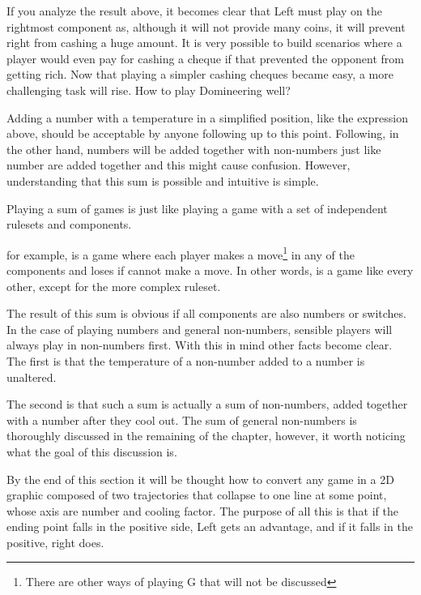 If you analyze the result above, it becomes clear that Left must play on the rightmost component as, although it will not provide many coins, it will prevent right from cashing a huge amount. It is very possible to build scenarios where a player would even pay for cashing a cheque if that prevented the opponent from getting rich. Now that playing a simpler cashing cheques became easy, a more challenging task will rise. How to play Domineering well?

Adding a number with a temperature in a simplified position, like the expression above, should be acceptable by anyone following up to this point. Following, in the other hand, numbers will be added together with non-numbers just like number are added together and this might cause confusion. However, understanding that this sum is possible and intuitive is simple.

Playing a sum of games is just like playing a game with a set of independent rulesets and components. \begin{center}
\end{center}
for example, is a game where each player makes a move\footnote{There are other ways of playing G that will not be discussed} in any of the components and loses if cannot make a move. In other words, \Gm{} is a game like every other, except for the more complex ruleset.

The result of this sum is obvious if all components are also numbers or switches. In the case of playing numbers and general non-numbers, sensible players will always play in non-numbers first. With this in mind other facts become clear. The first is that the temperature of a non-number added to a number is unaltered.

The second is that such a sum is actually a sum of non-numbers, added together with a number after they cool out. The sum of general non-numbers is thoroughly discussed in the remaining of the chapter, however, it worth noticing what the goal of this discussion is.

By the end of this section it will be thought how to convert any game in a 2D graphic composed of two trajectories that collapse to one line at some point, whose axis are number and cooling factor. The purpose of all this is that if the ending point falls in the positive side, Left gets an advantage, and if it falls in the positive, right does.

